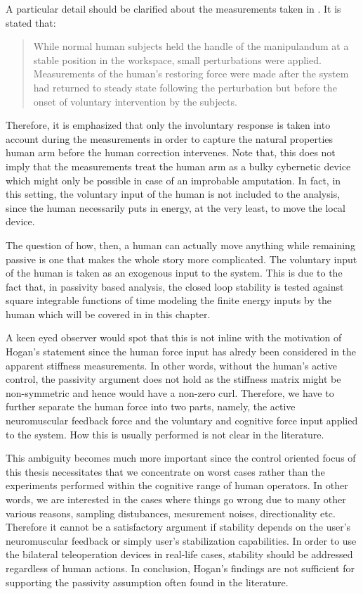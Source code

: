 \begin{rem}
A particular detail should be clarified about the measurements taken in \cite{hogan89}. It is stated that: 
\begin{quote}
While normal human subjects held the handle of the manipulandum at a stable position
in the workspace, small perturbations were applied. Measurements
of the human's restoring force were made after the system
had returned to steady state following the perturbation but before
the onset of voluntary intervention by the subjects.
\end{quote}
Therefore, it is emphasized that only the involuntary response is taken into account during the measurements in order to
capture the natural properties human arm before the human correction intervenes. Note that, this does not imply that the
measurements treat the human arm as a bulky cybernetic device which might only be possible in case of an improbable amputation.
In fact, in this setting, the voluntary input of the human is not included to the analysis, since the human necessarily puts in
energy, at the very least, to move the local device. 
\end{rem}

The question of how, then, a human can actually move anything while remaining passive is one that makes the whole 
story more complicated. The voluntary input of the human is taken as an exogenous input to the system. This is due to the 
fact that, in passivity based analysis, the closed loop stability is tested against square integrable functions of time 
modeling the finite energy inputs by the human which will be covered in  in this chapter.  

A keen eyed observer would spot that this is not inline with the motivation of Hogan's statement since the human force input has 
alredy been considered in the apparent stiffness measurements. In other words, without the human's active control, the passivity 
argument does not hold as the stiffness matrix might be non-symmetric and hence would have a non-zero curl. Therefore, we have to further
separate the human force into two parts, namely, the active neuromuscular feedback force and the voluntary and cognitive force 
input applied to the system. How this is usually performed is not clear in the literature. 

This ambiguity becomes much more important since the control oriented focus of this thesis necessitates that we concentrate on
worst cases rather than the experiments performed within the cognitive range of human operators. In other words, we are interested in
the cases where things go wrong due to many other various reasons, sampling distubances, mesurement noises, directionality etc. Therefore
it cannot be a satisfactory argument if stability depends on the user's neuromuscular feedback or simply user's stabilization capabilities. 
In order to use the bilateral teleoperation devices in real-life cases, stability should be addressed regardless of human actions. In 
conclusion, Hogan's findings are not sufficient for supporting the passivity assumption often found in the literature. 


